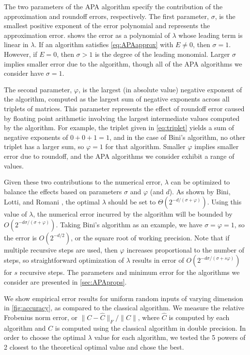 \documentclass[conference]{IEEEtran}
\begin{document}
The two parameters of the APA algorithm specify the contribution of the approximation and roundoff errors, respectively.
The first parameter, $\sigma$, is the smallest positive exponent of the error polynomial and represents the approximation error.
 shows the error as a polynomial of $\lambda$ whose leading term is linear in $\lambda$.
If an algorithm satisfies \cref{eq:APAapprox} with $E\neq 0$, then $\sigma=1$.
However, if $E=0$, then $\sigma>1$ is the degree of the leading monomial.
Larger $\sigma$ implies smaller error due to the algorithm, though all of the APA algorithms we consider have $\sigma=1$.

The second parameter, $\varphi$, is the largest (in absolute value) negative exponent of the algorithm, computed as the largest sum of negative exponents across all triplets of matrices.
This parameter represents the effect of roundoff error caused by floating point arithmetic involving the largest intermediate values computed by the algorithm.
For example, the triplet given in \cref{eq:triplet} yields a sum of negative exponents of $0+0+1=1$, and in the case of Bini's algorithm, no other triplet has a larger sum, so $\varphi=1$ for that algorithm.
Smaller $\varphi$ implies smaller error due to roundoff, and the APA algorithms we consider exhibit a range of values.

Given these two contributions to the numerical error, $\lambda$ can be optimized to balance the effects based on parameters $\sigma$ and $\varphi$ (and $d$).
As shown by Bini, Lotti, and Romani \cite{BLR80}, the optimal $\lambda$ should be set to $\Theta(2^{-d/(\sigma+\varphi)})$.
Using this value of $\lambda$, the numerical error incurred by the algorithm will be bounded by $O(2^{-d\sigma/(\sigma+\varphi)})$.
Taking Bini's algorithm as an example, we have $\sigma=\varphi=1$, so the error is $O(2^{-d/2})$, or the square root of working precision.
Note that if multiple recursive steps are used, then $\varphi$ increases proportional to the number of steps, so straightforward optimization of $\lambda$ results in error of $O(2^{-d\sigma/(\sigma+s\varphi)})$ for $s$ recursive steps.
The parameters and minimum error for the algorithms we consider are presented in \cref{sec:APAprops}.

We show empirical error results for uniform random inputs of varying dimension in \cref{fig:accuracy}, as compared to the classical algorithm.
We measure the relative Frobenius norm error, or $\|C-\hat C\|_F/\|C\|$, where $\hat C$ is computed by each algorithm and $C$ is computed using the classical algorithm in double precision.
In order to choose the optimal $\lambda$ value for each algorithm, we tested the 5 powers of 2 closest to the theoretical optimal value and chose the best.
\end{document}
